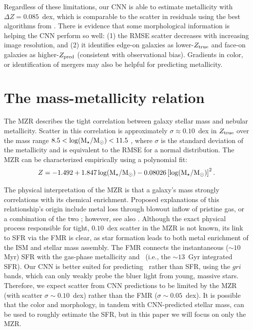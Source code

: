 \documentclass[fleqn,usenatbib]{mnras}
\begin{document}
Regardless of these limitations, our CNN is able to estimate metallicity with $\Delta Z = 0.085$~dex, which is comparable to the scatter in residuals using the best algorithms from \cite{Acquaviva2016}. There is evidence that some morphological information is helping the CNN perform so well: (1) the RMSE scatter decreases with increasing image resolution, and (2) it identifies edge-on galaxies as lower-$Z_{\rm true}$ and face-on galaxies as higher-$Z_{\rm pred}$ (consistent with observational bias). Gradients in color, or identification of mergers \citep[see, e.g.,][]{2018MNRAS.479..415A} may also be helpful for predicting metallicity.

\section{The mass-metallicity relation} \label{sec:MZR}
The MZR describes the tight correlation between galaxy stellar mass and nebular metallicity.
Scatter in this correlation is approximately $\sigma \approx 0.10$~dex in $Z_{\rm true}$ over the mass range $8.5 < \log (\hbox{M$_{\star}$} / \hbox{$\mathrm{M}_\odot$}) < 11.5$ \citep{Tremonti2004}, where $\sigma$ is the standard deviation of the metallicity and is equivalent to the RMSE for a normal distribution.
The MZR can be characterized empirically using a polynomial fit:
\begin{equation}\label{eq:mzr}
Z = -1.492 + 1.847 \log (\hbox{M$_{\star}$} / \hbox{$\mathrm{M}_\odot$}) - 0.08026 \left [\log(\hbox{M$_{\star}$} / \hbox{$\mathrm{M}_\odot$})\right ]^2.
\end{equation}

The physical interpretation of the MZR is that a galaxy's mass strongly correlations with its chemical enrichment.
Proposed explanations of this relationship's origin include metal loss through blowout \citep[e.g.,][]{2002ApJ...581.1019G,Tremonti2004} inflow of pristine gas, or a combination of the two \citep[][]{2013ApJ...772..119L}; however, see also \cite{2013A&A...554A..58S}.
Although the exact physical process responsible for tight, $0.10$~dex scatter in the MZR is not known, its link to SFR via the FMR is clear, as star formation leads to both metal enrichment of the ISM and stellar mass assembly.
The FMR connects the instantaneous ($\sim 10$ Myr) SFR with the gas-phase metallicity \citep[$\sim 1$~Gyr timescales; see, e.g.,][]{2011ApJ...734...48L} and \mstar\ (i.e., the $\sim 13$~Gyr integrated SFR).
Our CNN is better suited for predicting \mstar\ rather than SFR, using the $gri$ bands, which can only weakly probe the bluer light from young, massive stars.
Therefore, we expect scatter from CNN predictions to be limited by the MZR (with scatter $\sigma \sim 0.10$~dex) rather than the FMR ($\sigma \sim 0.05$~dex).
It is possible that the color and morphology, in tandem with CNN-predicted stellar mass, can be used to roughly estimate the SFR, but in this paper we will focus on only the MZR.
\end{document}
